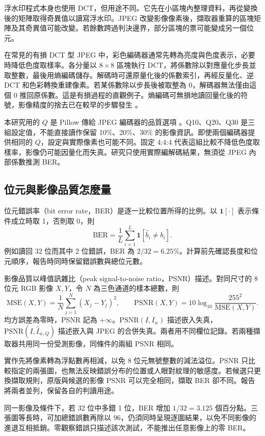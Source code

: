 \documentclass[12pt,a4paper,onecolumn]{article}
\begin{document}
浮水印程式本身也使用 DCT，但用途不同。它先在小區塊內整理資料，再從變換後的矩陣取得奇異值以讀寫浮水印。JPEG 改變影像像素後，擷取器重算的區塊矩陣及其奇異值可能改變。若餘數跨過判決邊界，部分區塊的票可能變成另一個位元。

在常見的有損 DCT 型 JPEG 中，彩色編碼器通常先轉為亮度與色度表示，必要時降低色度取樣率。各分量以 \(8\times8\) 區塊執行 DCT，將係數除以對應量化步長並取整數，最後用熵編碼儲存。解碼時可還原量化後的係數索引，再經反量化、逆 DCT 和色彩轉換重建像素。若某係數除以步長後被取整為 0，解碼器無法僅由這個 0 推回原係數。這是有損過程的直觀例子。熵編碼可無損地讀回量化後的符號，影像精度的捨去已在較早的步驟發生 \cite{jpeg}。

本研究用的 \(Q\) 是 Pillow 傳給 JPEG 編碼器的品質選項 \cite{pillow}。Q10、Q20、Q30 是三組設定值，不能直接讀作保留 10\%、20\%、30\% 的影像資訊。即使兩個編碼器提供相同的 \(Q\)，設定與實際像素也可能不同。固定 4:4:4 代表這組比較不降低色度取樣率，影像仍可能因量化而失真。研究只使用實際編解碼結果，無須從 JPEG 內部係數推測 BER。

\subsection{位元與影像品質怎麼量}
位元錯誤率（bit error rate，BER）是逐一比較位置所得的比例。以 \(\mathbf 1[\cdot]\) 表示條件成立時取 1，否則取 0，則
\[
 \mathrm{BER}=\frac{1}{L}\sum_{i=1}^{L}\mathbf 1[\widehat b_i\ne b_i].
\]
例如讀回 32 位而其中 2 位錯誤，BER 為 \(2/32=6.25\%\)。計算前先確認長度和位元順序，報告時同時保留錯誤數與總位元數。

影像品質以峰值訊雜比（peak signal-to-noise ratio，PSNR）描述。對同尺寸的 8 位元 RGB 影像 \(X,Y\)，令 \(N\) 為三色通道的樣本總數，則
\[
 \mathrm{MSE}(X,Y)=\frac{1}{N}\sum_{j=1}^{N}(X_j-Y_j)^2,\qquad
 \mathrm{PSNR}(X,Y)=10\log_{10}\frac{255^2}{\mathrm{MSE}(X,Y)}.
\]
均方誤差為零時，PSNR 記為 \(+\infty\)。\(\mathrm{PSNR}(I,I_w)\) 描述嵌入失真，\(\mathrm{PSNR}(I,\widehat I_{w,Q})\) 描述嵌入與 JPEG 的合併失真。兩者用不同欄位記錄。若兩種擷取器共用同一份受測影像，同條件的兩組 PSNR 相同。

實作先將像素轉為浮點數再相減，以免 8 位元無號整數的減法溢位。PSNR 只比較指定的兩張圖，也無法反映錯誤分布的位置或人眼對紋理的敏感度。若候選只更換擷取規則，原版與候選的影像 PSNR 可以完全相同，擷取 BER 卻不同。報告將兩者並列，保留各自的判讀用途。

同一影像及條件下，若 32 位中多錯 1 位，BER 增加 \(1/32=3.125\) 個百分點。三張圖等長時，可加總錯誤數再除以 96，仍須同時呈現逐圖結果，以免不同影像的進退互相抵銷。零觀察錯誤只描述該次測試，不能推出任意影像上的零 BER。
\end{document}
